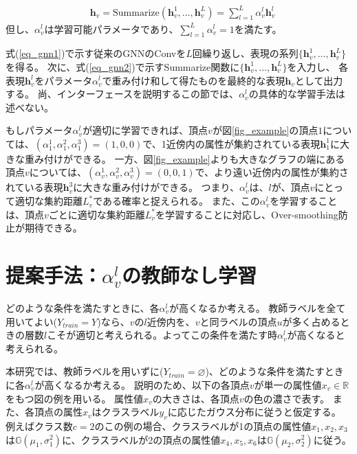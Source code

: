 \documentclass[a4j,twocolumn]{jsarticle}
\begin{document}
\begin{align}
  & \bm{h}_v   = \text{Summarize}(\bm{h}_v^1,\ldots,\bm{h}_v^L) = \sum_{l=1}^L \alpha_v^l \bm{h}_v^l \label{eq_summarize1}
\end{align}
但し、$\alpha_v^l$は学習可能パラメータであり、$\sum_{l=1}^L \alpha_v^l=1$を満たす。

式(\ref{eq_gnn1})で示す従来のGNNのConvを$L$回繰り返し、表現の系列$\{\bm{h}_v^1,\ldots,\bm{h}_v^L\}$を得る。
次に、式(\ref{eq_gnn2})で示すSummarize関数に$\{\bm{h}_v^1,\ldots,\bm{h}_v^L\}$を入力し、
各表現$\bm{h}_v^l$をパラメータ$\alpha_v^l$で重み付け和して得たものを最終的な表現$\bm{h}_v$として出力する。
尚、インターフェースを説明するこの節では、$\alpha_v^l$の具体的な学習手法は述べない。

もしパラメータ$\alpha_v^l$が適切に学習できれば、頂点$v$が図\ref{fig_example}の頂点$1$については、$(\alpha_1^1,\alpha_1^2,\alpha_1^3)=(1,0,0)$で、1近傍内の属性が集約されている表現$\bm{h}_1^1$に大きな重み付けができる。
一方、図\ref{fig_example}よりも大きなグラフの端にある頂点$v$については、$(\alpha_v^1,\alpha_v^2,\alpha_v^3)=(0,0,1)$で、より遠い近傍内の属性が集約されている表現$\bm{h}_v^3$に大きな重み付けができる。
つまり、$\alpha_v^l$は、$l$が、頂点$v$にとって適切な集約距離$L_v^*$である確率と捉えられる。
また、この$\alpha_v^l$を学習することは、頂点$v$ごとに適切な集約距離$L_v^*$を学習することに対応し、Over-smoothing防止が期待できる。

\section{提案手法：$\alpha_v^l$の教師なし学習}
\label{sec_oversmoothing}

どのような条件を満たすときに、各$\alpha_v^l$が高くなるか考える。
教師ラベルを全て用いてよい($Y_{train}=Y$)なら、$v$の$l$近傍内を、$v$と同ラベルの頂点$u$が多く占めるときの層数$l$こそが適切と考えられる。よってこの条件を満たす時$\alpha_v^l$が高くなると考えられる。

本研究では、教師ラベルを用いずに($Y_{train}=\varnothing$)、どのような条件を満たすときに各$\alpha_v^l$が高くなるか考える。
説明のため、以下の各頂点$v$が単一の属性値$x_v\in \mathbb{R}$をもつ図の例を用いる。
属性値$x_v$の大きさは、各頂点$v$の色の濃さで表す。
また、各頂点の属性$x_v$はクラスラベル$y_v$に応じたガウス分布に従うと仮定する。
例えばクラス数$c=2$のこの例の場合、クラスラベルが1の頂点の属性値$x_1,x_2,x_3$は$\mathbb{G}(\mu_1, \sigma_1^2)$に、クラスラベルが2の頂点の属性値$x_4,x_5,x_6$は$\mathbb{G}(\mu_2, \sigma_2^2)$に従う。
\end{document}
